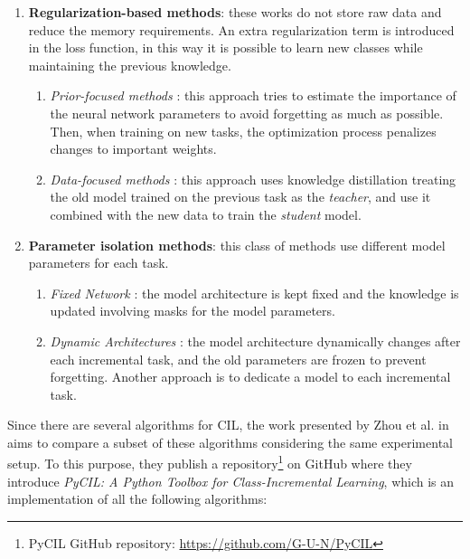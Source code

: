 \begin{enumerate}
    \item \textbf{Regularization-based methods}: these works do not store raw data and reduce the memory requirements. An extra regularization term is introduced in the loss function, in this way it is possible to learn new classes while maintaining the previous knowledge.
    \begin{enumerate}
        \item \textit{Prior-focused methods} \cite{kirkpatrick2017overcoming, lee2017overcoming, zenke2017continual, liu2018rotate, aljundi2018memory, chaudhry2018riemannian}: this approach tries to estimate the importance of the neural network parameters to avoid forgetting as much as possible. Then, when training on new tasks, the optimization process penalizes changes to important weights.
        \item \textit{Data-focused methods} \cite{li2017learning, jung2016less, zhang2020class, rannen2017encoder}: this approach uses knowledge distillation \cite{hinton2015distilling} treating the old model trained on the previous task as the \textit{teacher}, and use it combined with the new data to train the \textit{student} model.
    \end{enumerate}
    \item \textbf{Parameter isolation methods}: this class of methods use different model parameters for each task.
    \begin{enumerate}
        \item \textit{Fixed Network} \cite{mallya2018packnet, mallya2018piggyback, serra2018overcoming, fernando2017pathnet}: the model architecture is kept fixed and the knowledge is updated involving masks for the model parameters.
        \item \textit{Dynamic Architectures} \cite{rusu2016progressive, xu2018reinforced, aljundi2017expert, rosenfeld2018incremental}: the model architecture dynamically changes after each incremental task, and the old parameters are frozen to prevent forgetting. Another approach is to dedicate a model to each incremental task.
    \end{enumerate}
\end{enumerate}

Since there are several algorithms for CIL, the work presented by Zhou et al. in \cite{zhou2021pycil} aims to compare a subset of these algorithms considering the same experimental setup. To this purpose, they publish a repository\footnote{PyCIL GitHub repository: \href{https://github.com/G-U-N/PyCIL}{https://github.com/G-U-N/PyCIL}}
on GitHub where they introduce \textit{PyCIL: A Python Toolbox for Class-Incremental Learning}, which is an implementation of all the following algorithms:

